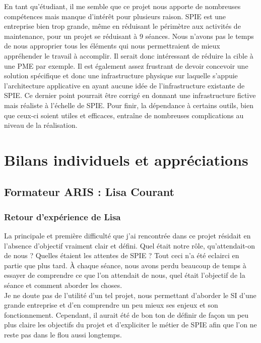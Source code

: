 En tant qu’étudiant, il me semble que ce projet nous apporte de nombreuses compétences mais manque d’intérêt pour plusieurs raison. SPIE est une entreprise bien trop grande, même en réduisant le périmètre aux activités de maintenance, pour un projet se réduisant à 9 séances. Nous n’avons pas le temps de nous approprier tous les éléments qui nous permettraient de mieux appréhender le travail à accomplir. Il serait donc intéressant de réduire la cible à une PME par exemple. Il est également assez frustrant de devoir concevoir une solution spécifique et donc une infrastructure physique sur laquelle s’appuie l’architecture applicative en ayant aucune idée de l’infrastructure existante de SPIE. Ce dernier point pourrait être corrigé en donnant une infrastructure fictive mais réaliste à l’échelle de SPIE. Pour finir, la dépendance à certains outils, bien que ceux-ci soient utiles et efficaces, entraîne de nombreuses complications au niveau de la réalisation.

\section{Bilans individuels et appréciations}

\subsection{Formateur ARIS : Lisa Courant}

\subsubsection{Retour d'expérience de Lisa}

La principale et première difficulté que j’ai rencontrée dans ce projet résidait en l’absence d’objectif vraiment clair et défini. Quel était notre rôle, qu’attendait-on de nous ? Quelles étaient les attentes de SPIE ? Tout ceci n’a été eclairci en partie que plus tard. À chaque séance, nous avons perdu beaucoup de temps à essayer de comprendre ce que l’on attendait de nous, quel était l’objectif de la séance et comment aborder les choses. \\

Je ne doute pas de l’utilité d’un tel projet, nous permettant d’aborder le SI d’une grande entreprise et d’en comprendre un peu mieux ses enjeux et son fonctionnement. Cependant, il aurait été de bon ton de définir de façon un peu plus claire les objectifs du projet et d’expliciter le métier de SPIE afin que l’on ne reste pas dans le flou aussi longtemps. \\

